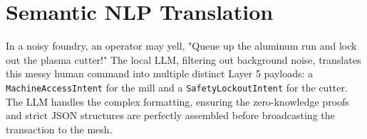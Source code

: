 \section{Semantic NLP Translation}
In a noisy foundry, an operator may yell, "Queue up the aluminum run and lock out the plasma cutter!" The local LLM, filtering out background noise, translates this messy human command into multiple distinct Layer 5 payloads: a \texttt{MachineAccessIntent} for the mill and a \texttt{SafetyLockoutIntent} for the cutter. The LLM handles the complex formatting, ensuring the zero-knowledge proofs and strict JSON structures are perfectly assembled before broadcasting the transaction to the mesh.

